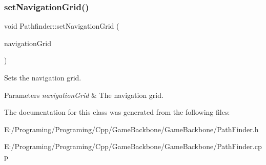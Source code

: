 \subsubsection{\texorpdfstring{set\+Navigation\+Grid()}{setNavigationGrid()}}
{\footnotesize\ttfamily void Pathfinder\+::set\+Navigation\+Grid (\begin{DoxyParamCaption}\item[{\hyperlink{class_array3_d}{Navigation\+Grid} $\ast$}]{navigation\+Grid }\end{DoxyParamCaption})}



Sets the navigation grid. 


\begin{DoxyParams}{Parameters}
{\em navigation\+Grid} & The navigation grid.\\
\hline
\end{DoxyParams}


The documentation for this class was generated from the following files\+:\begin{DoxyCompactItemize}
\item 
E\+:/\+Programing/\+Programing/\+Cpp/\+Game\+Backbone/\+Game\+Backbone/Path\+Finder.\+h\item 
E\+:/\+Programing/\+Programing/\+Cpp/\+Game\+Backbone/\+Game\+Backbone/Path\+Finder.\+cpp\end{DoxyCompactItemize}
